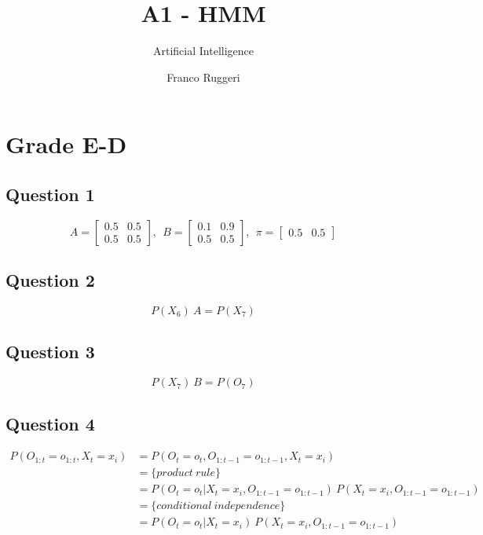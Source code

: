 \documentclass{scrartcl}
\title{A1 - HMM}
\subtitle{Artificial Intelligence}
\author{Franco Ruggeri}
\begin{document}
\maketitle

\section{Grade E-D}

\subsection{Question 1}

\begin{equation}
 A = 
 \begin{bmatrix}
  0.5 & 0.5 \\
  0.5 & 0.5
 \end{bmatrix} 
 ,\ \ B = 
 \begin{bmatrix}
  0.1 & 0.9 \\
  0.5 & 0.5
 \end{bmatrix} 
 ,\ \ \pi = 
 \begin{bmatrix}
  0.5 & 0.5
 \end{bmatrix} 
\end{equation}

\subsection{Question 2}

\begin{equation}
 P(X_6)\ A = P(X_7)
\end{equation}
 
\subsection{Question 3}

\begin{equation}
 P(X_7)\ B = P(O_7)
\end{equation}

\subsection{Question 4}

\begin{align}
 P(O_{1:t}=o_{1:t}, X_t=x_i) &= P(O_t=o_t, O_{1:t-1}=o_{1:t-1}, X_t=x_i) \nonumber \\
 &= \{product\ rule\} \nonumber \\
 &= P(O_t=o_t | X_t=x_i, O_{1:t-1}=o_{1:t-1})\ P(X_t=x_i, O_{1:t-1}=o_{1:t-1}) \nonumber \\
 &= \{conditional\ independence\} \nonumber \\
 &= P(O_t=o_t | X_t=x_i)\ P(X_t=x_i, O_{1:t-1}=o_{1:t-1})
\end{align}
\end{document}
